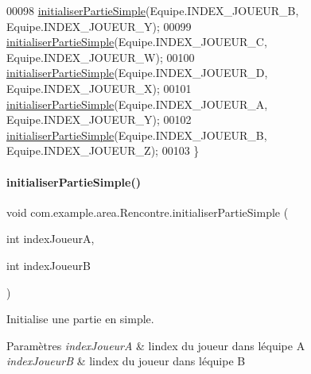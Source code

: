 \begin{DoxyCode}
00098         \hyperlink{classcom_1_1example_1_1area_1_1_rencontre_afe8119a55e348caf296514d604718646}{initialiserPartieSimple}(Equipe.INDEX\_JOUEUR\_B, Equipe.INDEX\_JOUEUR\_Y);
00099         \hyperlink{classcom_1_1example_1_1area_1_1_rencontre_afe8119a55e348caf296514d604718646}{initialiserPartieSimple}(Equipe.INDEX\_JOUEUR\_C, Equipe.INDEX\_JOUEUR\_W);
00100         \hyperlink{classcom_1_1example_1_1area_1_1_rencontre_afe8119a55e348caf296514d604718646}{initialiserPartieSimple}(Equipe.INDEX\_JOUEUR\_D, Equipe.INDEX\_JOUEUR\_X);
00101         \hyperlink{classcom_1_1example_1_1area_1_1_rencontre_afe8119a55e348caf296514d604718646}{initialiserPartieSimple}(Equipe.INDEX\_JOUEUR\_A, Equipe.INDEX\_JOUEUR\_Y);
00102         \hyperlink{classcom_1_1example_1_1area_1_1_rencontre_afe8119a55e348caf296514d604718646}{initialiserPartieSimple}(Equipe.INDEX\_JOUEUR\_B, Equipe.INDEX\_JOUEUR\_Z);
00103     \}
\end{DoxyCode}
\mbox{\label{classcom_1_1example_1_1area_1_1_rencontre_afe8119a55e348caf296514d604718646}} 
\paragraph{\texorpdfstring{initialiser\+Partie\+Simple()}{initialiserPartieSimple()}}
{\footnotesize\ttfamily void com.\+example.\+area.\+Rencontre.\+initialiser\+Partie\+Simple (\begin{DoxyParamCaption}\item[{int}]{index\+JoueurA,  }\item[{int}]{index\+JoueurB }\end{DoxyParamCaption})\hspace{0.3cm}{\ttfamily [private]}}



Initialise une partie en simple. 


\begin{DoxyParams}{Paramètres}
{\em index\+JoueurA} & l\textquotesingle{}index du joueur dans l\textquotesingle{}équipe A \\
\hline
{\em index\+JoueurB} & l\textquotesingle{}index du joueur dans l\textquotesingle{}équipe B \\
\hline
\end{DoxyParams}


